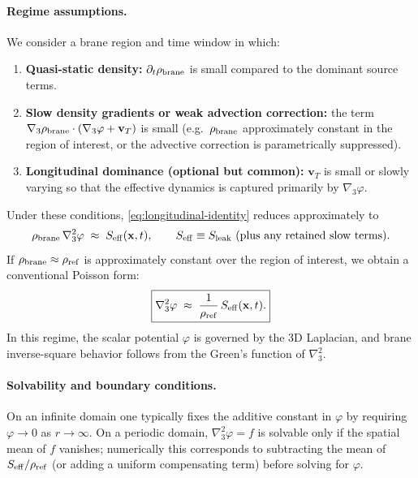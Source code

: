 \documentclass[11pt]{article}
\newcommand{\rhoref}{\rho_{\rm ref}}
\begin{document}
\paragraph{Regime assumptions.}
We consider a brane region and time window in which:
\begin{enumerate}[leftmargin=2.2em]
\item \textbf{Quasi-static density:} $\partial_t\rho_{\rm brane}$ is small compared to the dominant source terms.
\item \textbf{Slow density gradients or weak advection correction:} the term $\nabla_3\rho_{\rm brane}\cdot(\nabla_3\varphi+\mathbf{v}_T)$ is small (e.g.\ $\rho_{\rm brane}$ approximately constant in the region of interest, or the advective correction is parametrically suppressed).
\item \textbf{Longitudinal dominance (optional but common):} $\mathbf{v}_T$ is small or slowly varying so that the effective dynamics is captured primarily by $\nabla_3\varphi$.
\end{enumerate}
Under these conditions, \eqref{eq:longitudinal-identity} reduces approximately to
\begin{equation}
\rho_{\rm brane}\,\nabla_3^2\varphi \;\approx\; S_{\rm eff}(\mathbf{x},t),
\qquad
S_{\rm eff}\equiv S_{\rm leak}\ \text{(plus any retained slow terms)}.
\label{eq:poisson-approx-general}
\end{equation}
If $\rho_{\rm brane}\approx \rhoref$ is approximately constant over the region of interest, we obtain a conventional Poisson form:
\begin{equation}
\boxed{
\nabla_3^2\varphi \;\approx\; \frac{1}{\rhoref}\,S_{\rm eff}(\mathbf{x},t).
}
\label{eq:poisson-approx}
\end{equation}
In this regime, the scalar potential $\varphi$ is governed by the 3D Laplacian, and brane inverse-square behavior follows from the Green's function of $\nabla_3^2$.

\paragraph{Solvability and boundary conditions.}
On an infinite domain one typically fixes the additive constant in $\varphi$ by requiring $\varphi\to 0$ as $r\to\infty$. On a periodic domain, $\nabla_3^2\varphi=f$ is solvable only if the spatial mean of $f$ vanishes; numerically this corresponds to subtracting the mean of $S_{\rm eff}/\rhoref$ (or adding a uniform compensating term) before solving for $\varphi$.
\end{document}
